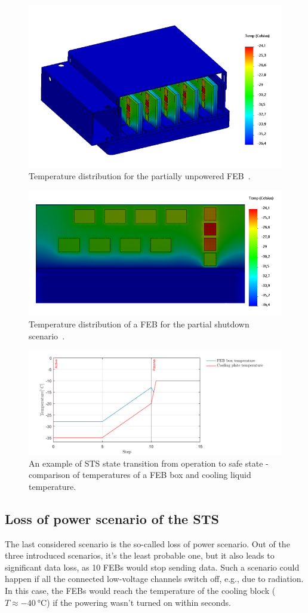 \begin{figure}[!h]
\centering
\includegraphics[width=0.6\columnwidth]{Chapter4/images/reboot_box.png}
\caption{Temperature distribution for the partially unpowered \gls{FEB}~\cite{Agarwal}.}
\label{fig_reboot_box}
\end{figure}

\begin{figure}[!h]
\centering
\includegraphics[width=0.6\columnwidth]{Chapter4/images/reboot_FEB.png}
\caption{Temperature distribution of a \gls{FEB} for the partial shutdown scenario~\cite{Agarwal}.}
\label{fig_reboot_FEB}
\end{figure}

\begin{figure}[!h]
\centering
\includegraphics[width=0.85\columnwidth]{Chapter4/images/nominal.png}
\caption{An example of \gls{STS} state transition from operation to safe state - comparison of temperatures of a \gls{FEB} box and cooling liquid temperature.}
\label{fig_reboot_nominal2}
\end{figure}

\newpage
\subsection{Loss of power scenario of the STS}
\label{power_loss}
The last considered scenario is the so-called loss of power scenario. Out of the three introduced scenarios, it's the least probable one, but it also leads to significant data loss, as 10 \glspl{FEB} would stop sending data. Such a scenario could happen if all the connected low-voltage channels switch off, e.g., due to radiation. In this case, the \glspl{FEB} would reach the temperature of the cooling block ($T \approx \SI{-40}{\celsius}$) if the powering wasn't turned on within seconds.

